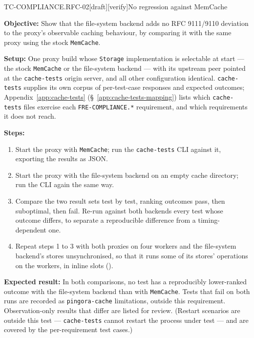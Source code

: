 \begin{requirement}{TC-COMPLIANCE.RFC-02}[draft][verify]{No regression against MemCache}


  \textbf{Objective:} Show that the file-system backend adds no RFC 9111/9110
  deviation to the proxy's observable caching behaviour, by comparing it with
  the same proxy using the stock \texttt{MemCache}.

  \textbf{Setup:} One proxy build whose \texttt{Storage} implementation is
  selectable at start --- the stock \texttt{MemCache} or the file-system
  backend --- with its upstream peer pointed at the \texttt{cache-tests}
  origin server, and all other configuration identical. \texttt{cache-tests}
  supplies its own corpus of per-test-case responses and expected outcomes;
  Appendix~\ref{app:cache-tests} (\S~\ref{app:cache-tests-mapping}) lists
  which \texttt{cache-tests} files exercise each \texttt{FRE-COMPLIANCE.*}
  requirement, and which requirements it does not reach.

  \textbf{Steps:}
  \begin{enumerate}
    \item Start the proxy with \texttt{MemCache}; run the \texttt{cache-tests}
      CLI against it, exporting the results as JSON.
    \item Start the proxy with the file-system backend on an empty cache
      directory; run the CLI again the same way.
    \item Compare the two result sets test by test, ranking outcomes pass,
      then suboptimal, then fail. Re-run against both backends every test
      whose outcome differs, to separate a reproducible difference from a
      timing-dependent one.
    \item Repeat steps 1 to 3 with both proxies on four workers and the
      file-system backend's stores unsynchronised, so that it runs some of
      its stores' operations on the workers, in inline slots
      ().
  \end{enumerate}

  \textbf{Expected result:} In both comparisons, no test has a reproducibly
  lower-ranked outcome with the file-system backend than with
  \texttt{MemCache}. Tests that fail on
  both runs are recorded as \texttt{pingora-cache} limitations, outside this
  requirement. Observation-only results that differ are listed for review.
  (Restart scenarios are outside this test --- \texttt{cache-tests} cannot
  restart the process under test --- and are covered by the per-requirement
  test cases.)


\end{requirement}

